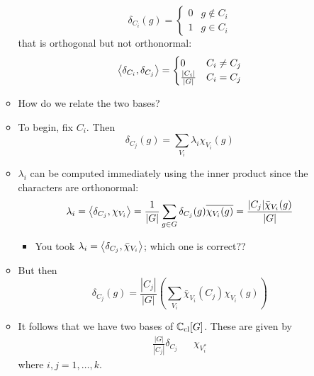 \documentclass[../notes.tex]{subfiles}
\begin{document}
\begin{itemize}
\begin{itemize}
        \begin{equation*}
            \delta_{C_i}(g) =
            \begin{cases}
                0 & g\notin C_i\\
                1 & g\in C_i
            \end{cases}
        \end{equation*}
        that is orthogonal but not orthonormal:
        \begin{equation*}
            \left\langle{\delta_{C_i},\delta_{C_j}}\right\rangle =
            \begin{cases}
                0 & C_i\neq C_j\\
                \frac{|C_i|}{|G|} & C_i=C_j
            \end{cases}
        \end{equation*}
        \item How do we relate the two bases?
        \item To begin, fix $C_i$. Then
        \begin{equation*}
            \delta_{C_j}(g) = \sum_{V_i}\lambda_i\chi_{V_i}(g)
        \end{equation*}
        \item $\lambda_i$ can be computed immediately using the inner product since the characters are orthonormal:
        \begin{equation*}
            \lambda_i = \left\langle{\delta_{C_j},\chi_{V_i}}\right\rangle
            = \frac{1}{|G|}\sum_{g\in G}\delta_{C_j}(g)\overline{\chi_{V_i}(g)}
            = \frac{|C_j|\bar{\chi}_{V_i}(g)}{|G|}
        \end{equation*}
        \begin{itemize}
            \item You took $\lambda_i = \left\langle{\delta_{C_j},\bar{\chi}_{V_i}}\right\rangle$; which one is correct??
        \end{itemize}
        \item But then
        \begin{equation*}
            \delta_{C_j}(g) = \frac{|C_j|}{|G|}\left( \sum_{V_i}\bar{\chi}_{V_i}(C_j)\chi_{V_i}(g) \right)
        \end{equation*}
        \item It follows that we have two bases of $\mathbb{C}_\text{cl}[G]$. These are given by
        \begin{align*}
            \frac{|G|}{|C_j|}\delta_{C_j}&&
            \chi_{V_i^*}
        \end{align*}
        where $i,j=1,\dots,k$.

\end{itemize}
\end{itemize}
\end{document}
